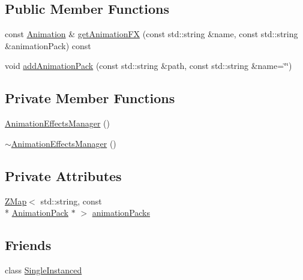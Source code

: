 \subsection*{Public Member Functions}
\begin{DoxyCompactItemize}
\item 
const \hyperlink{classZeta_1_1Animation}{Animation} \& \hyperlink{classZeta_1_1AnimationEffectsManager_ade4093a0103e37f447b20d16c4e74ccb}{get\+Animation\+F\+X} (const std\+::string \&name, const std\+::string \&animation\+Pack) const 
\item 
void \hyperlink{classZeta_1_1AnimationEffectsManager_a886e393d24c8f2f1db24fc1ab74b591c}{add\+Animation\+Pack} (const std\+::string \&path, const std\+::string \&name=\char`\"{}\char`\"{})
\end{DoxyCompactItemize}
\subsection*{Private Member Functions}
\begin{DoxyCompactItemize}
\item 
\hyperlink{classZeta_1_1AnimationEffectsManager_aab69711ef8a65d33d85d19ada9a0d2fa}{Animation\+Effects\+Manager} ()
\item 
\hyperlink{classZeta_1_1AnimationEffectsManager_a1d80cddee87e29b1f04df633547d8282}{$\sim$\+Animation\+Effects\+Manager} ()
\end{DoxyCompactItemize}
\subsection*{Private Attributes}
\begin{DoxyCompactItemize}
\item 
\hyperlink{namespaceZeta_a9af2e12c4e432d2a1725f19e5a648a04}{Z\+Map}$<$ std\+::string, const \\*
\hyperlink{classZeta_1_1AnimationPack}{Animation\+Pack} $\ast$ $>$ \hyperlink{classZeta_1_1AnimationEffectsManager_a3850f148abb88205f126e936cea09266}{animation\+Packs}
\end{DoxyCompactItemize}
\subsection*{Friends}
\begin{DoxyCompactItemize}
\item 
class \hyperlink{classZeta_1_1AnimationEffectsManager_a2fa95d69b32a77fffa4b730679a8b08c}{Single\+Instanced}
\end{DoxyCompactItemize}
